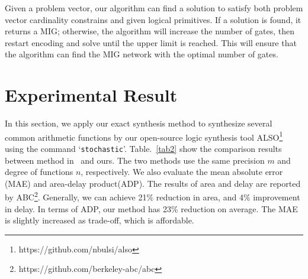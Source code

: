 \documentclass[conference,letterpaper]{IEEEtran}
\begin{document}
%

Given a problem vector, our algorithm can find a solution to satisfy both problem vector cardinality constrains and given logical primitives. If a solution is found, it returns a MIG; otherwise, the algorithm will increase the number of gates, then restart encoding and solve until the upper limit is reached. This will ensure that the algorithm can find the MIG network with the optimal number of gates.


\section*{Experimental Result}
In this section, we apply our exact synthesis method to synthesize several common arithmetic functions by our open-source logic synthesis tool ALSO\footnote{https://github.com/nbulsi/also} using the command `\texttt{stochastic}'. Table.~\ref{tab2} show the comparison results between method in~\cite{2} and ours.
The two methods use the same precision $m$ and degree of functions $n$, respectively. We also evaluate the mean absolute error (MAE) and area-delay product(ADP). 
The results of area and delay are reported by ABC\footnote{https://github.com/berkeley-abc/abc}.
Generally, we can achieve 21\% reduction in area, and 4\% improvement in delay. In terms of ADP, our method has 23\% reduction on average.
The MAE is slightly increased as trade-off, which is affordable.
\end{document}
